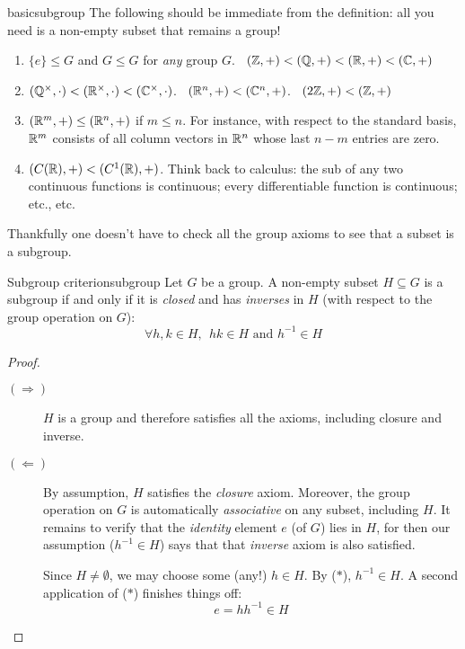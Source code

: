 \begin{examples}{}{basicsubgroup}
	The following should be immediate from the definition: all you need is a non-empty subset that remains a group!
	\begin{enumerate}
	  \item\label{ex:basicsubgroup1} $\{e\}\le G$ and $G\le G$ for \emph{any} group $G$\qquad\qquad{}. \ $(\mathbb{Z},+)<(\mathbb{Q},+)<(\mathbb{R},+)<(\mathbb{C},+)$
	  \setcounter{enumi}{2}
		\item $(\mathbb{Q}^\times,\cdot)<(\mathbb{R}^\times,\cdot)<(\mathbb{C}^\times,\cdot)$\qquad{}. \ $(\mathbb{R}^n,+)<(\mathbb{C}^n,+)$\qquad{}. \ $(2\mathbb{Z},+)<(\mathbb{Z},+)$
		\item $(\mathbb{R}^m,+)\le (\mathbb{R}^n,+)$ if $m\le n$. For instance, with respect to the standard basis, $\mathbb{R}^m$ consists of all column vectors in $\mathbb{R}^n$ whose last $n-m$ entries are zero.
		\item$(C(\mathbb{R}),+)<(C^1(\mathbb{R}),+)$. Think back to calculus: the sub of any two continuous functions is continuous; every differentiable function is continuous; etc., etc.
	\end{enumerate}
\end{examples}

Thankfully one doesn't have to check all the group axioms to see that a subset is a subgroup.

\begin{thm}{Subgroup criterion}{subgroup}
	Let $G$ be a group. A non-empty subset $H\subseteq G$ is a subgroup if and only if it is \emph{closed} and has \emph{inverses} in $H$ (with respect to the group operation on $G$):
	\[
		\forall h,k\in H,\ \ hk\in H \text{ and }  h^{-1}\in H \tag{$\ast$}
	\]
\end{thm}

\begin{proof}
	\begin{description}
	\item[$(\Rightarrow)$] $H$ is a group and therefore satisfies all the axioms, including closure and inverse.
	\item[$(\Leftarrow)$] By assumption, $H$ satisfies the \emph{closure} axiom. Moreover, the group operation on $G$ is automatically \emph{associative} on any subset,\footnotemark{} including $H$. It remains to verify that the \emph{identity} element $e$ (of $G$) lies in $H$, for then our assumption ($h^{-1}\in H$) says that that \emph{inverse} axiom is also satisfied.\par
	Since $H\neq\emptyset$, we may choose some (any!) $h\in H$. By ($\ast$), $h^{-1}\in H$. A second application of ($\ast$) finishes things off:
	\[
		e=hh^{-1}\in H \tag*{\qedhere}
	\]
	\end{description}
\end{proof}

